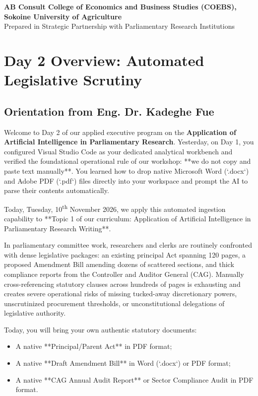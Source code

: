\documentclass[11pt, a4paper]{report}
\begin{document}
\begin{titlepage}
    \vfill
    {\footnotesize \textbf{AB Consult \textbullet{} College of Economics and Business Studies (COEBS), Sokoine University of Agriculture}\\
    Prepared in Strategic Partnership with Parliamentary Research Institutions}
    \vspace*{0.2cm}
\end{titlepage}

\tableofcontents
\newpage

\chapter{Day 2 Overview: Automated Legislative Scrutiny}

\section{Orientation from Eng. Dr. Kadeghe Fue}
Welcome to Day 2 of our applied executive program on the \textbf{Application of Artificial Intelligence in Parliamentary Research}. Yesterday, on Day 1, you configured Visual Studio Code as your dedicated analytical workbench and verified the foundational operational rule of our workshop: **we do not copy and paste text manually**. You learned how to drop native Microsoft Word (`.docx`) and Adobe PDF (`.pdf`) files directly into your workspace and prompt the AI to parse their contents automatically.

Today, Tuesday, 10\textsuperscript{th} November 2026, we apply this automated ingestion capability to **Topic 1 of our curriculum: Application of Artificial Intelligence in Parliamentary Research Writing**.

In parliamentary committee work, researchers and clerks are routinely confronted with dense legislative packages: an existing principal Act spanning 120 pages, a proposed Amendment Bill amending dozens of scattered sections, and thick compliance reports from the Controller and Auditor General (CAG). Manually cross-referencing statutory clauses across hundreds of pages is exhausting and creates severe operational risks of missing tucked-away discretionary powers, unscrutinized procurement thresholds, or unconstitutional delegations of legislative authority.

Today, you will bring your own authentic statutory documents:
\begin{itemize}[label=-]
    \item A native **Principal/Parent Act** in PDF format;
    \item A native **Draft Amendment Bill** in Word (`.docx`) or PDF format;
    \item A native **CAG Annual Audit Report** or Sector Compliance Audit in PDF format.
\end{itemize}
\end{document}
